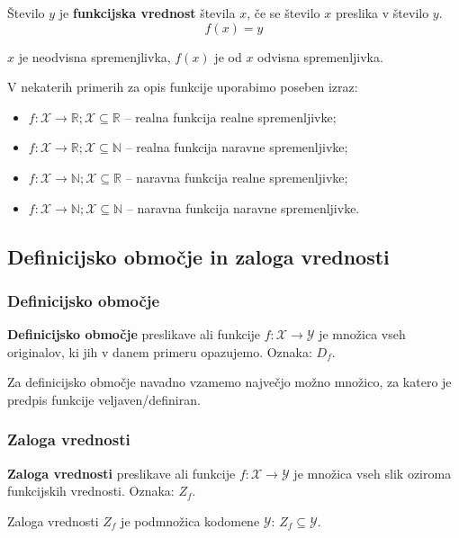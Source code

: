         Število $y$ je \textbf{funkcijska vrednost} števila $x$, če se število $x$ preslika v število $y$. 
        $$ f(x)=y $$

        $x$ je neodvisna spremenjlivka, $f(x)$ je od $x$ odvisna spremenljivka.



        V nekaterih primerih za opis funkcije uporabimo poseben izraz:
        \begin{itemize}
            \item $f:\mathcal{X}\to\mathbb{R}; \mathcal{X}\subseteq\mathbb{R}$ -- realna funkcija realne spremenljivke;
            \item $f:\mathcal{X}\to\mathbb{R}; \mathcal{X}\subseteq\mathbb{N}$ -- realna funkcija naravne spremenljivke;
            \item $f:\mathcal{X}\to\mathbb{N}; \mathcal{X}\subseteq\mathbb{R}$ -- naravna funkcija realne spremenljivke;
            \item $f:\mathcal{X}\to\mathbb{N}; \mathcal{X}\subseteq\mathbb{N}$ -- naravna funkcija naravne spremenljivke.
        \end{itemize}



    \subsection*{Definicijsko območje in zaloga vrednosti}

    \subsubsection*{Definicijsko območje}
        \textbf{Definicijsko območje} preslikave ali funkcije $f:\mathcal{X}\to\mathcal{Y}$ je množica vseh originalov, ki jih v danem primeru opazujemo. 
        Oznaka: $D_f$.                

        Za definicijsko območje navadno vzamemo največjo možno množico, za katero je predpis funkcije veljaven/definiran.

        
    \subsubsection*{Zaloga vrednosti}
        \textbf{Zaloga vrednosti} preslikave ali funkcije $f:\mathcal{X}\to\mathcal{Y}$ je množica vseh slik oziroma funkcijskih vrednosti.
        Oznaka: $Z_f$.

        Zaloga vrednosti $Z_f$ je podmnožica kodomene $\mathcal{Y}$: $Z_f\subseteq \mathcal{Y}$.





